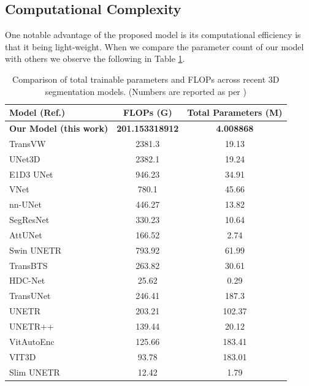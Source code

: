 \documentclass[a4paper,fleqn]{cas-dc}
\begin{document}
\subsection{Computational Complexity}

One notable advantage of the proposed model is its computational efficiency is that it being light-weight. When we compare the parameter count of our model with others we observe the following in Table \ref{tab:parameter_comparison}.

\begin{table}[!htbp]
    \caption{Comparison of total trainable parameters and FLOPs across recent 3D segmentation models. (Numbers are reported as per \cite{SlimUNETR})}
    \label{tab:parameter_comparison}
    \centering
    \begin{tabular}{lcc}
        \toprule
        Model (Ref.)                           & FLOPs (G) & Total Parameters (M) \\
        \midrule
        \textbf{Our Model (this work)}         & \textbf{201.153318912} & \textbf{4.008868} \\
        TransVW                         & 2381.3  & 19.13  \\
        UNet3D                          & 2382.1  & 19.24  \\
        E1D3 UNet                       & 946.23  & 34.91  \\
        VNet                                    & 780.1   & 45.66  \\
        nn-UNet\cite{isensee2021nnu}                                 & 446.27  & 13.82  \\
        SegResNet                               & 330.23  & 10.64  \\
        AttUNet                                 & 166.52  & 2.74   \\
        Swin UNETR\cite{hatamizadeh2021swin}    & 793.92  & 61.99  \\
        TransBTS\cite{wang2021transbts}        & 263.82  & 30.61  \\
        HDC-Net\cite{HDCNet}            & 25.62   & 0.29   \\
        TransUNet                       & 246.41  & 187.3  \\
        UNETR\cite{hatamizadeh2022unetr}                           & 203.21  & 102.37 \\
        UNETR++                         & 139.44  & 20.12  \\
        VitAutoEnc                      & 125.66  & 183.41 \\
        VIT3D                           & 93.78   & 183.01 \\
        Slim UNETR\cite{SlimUNETR}      & 12.42   & 1.79 \\
        \bottomrule
    \end{tabular}
\end{table}
\end{document}
